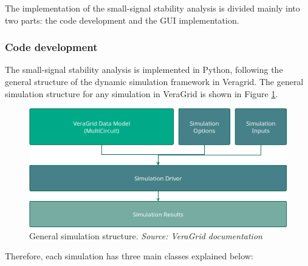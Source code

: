 The implementation of the small-signal stability analysis is divided mainly into two parts: the code development
 and the GUI implementation. 

\subsubsection{Code development}

The small-signal stability analysis is implemented in Python, following the general structure of the 
dynamic simulation framework in Veragrid. The general simulation structure for any simulation in VeraGrid
 is shown in Figure \ref{fig:General_Simulation_Structure}. 

\begin{figure}[H]
  \centering
  \includegraphics[width=0.8\linewidth]{figures/DataModelSimulationStructure.png}
  \caption{General simulation structure. \textit{Source: VeraGrid documentation \cite{veragrid}}}
  \label{fig:General_Simulation_Structure}
\end{figure}

Therefore, each simulation has three main classes explained below:

